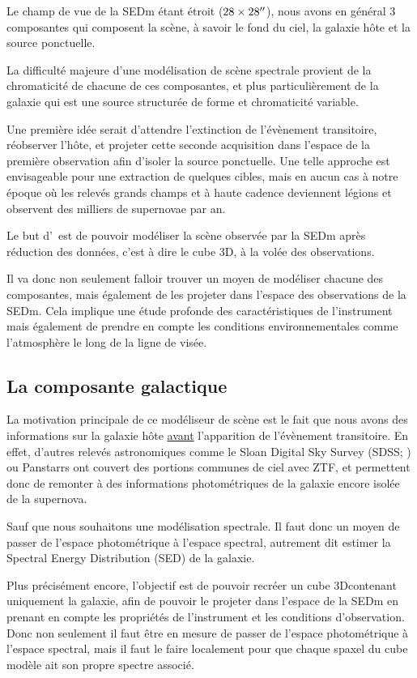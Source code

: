 \documentclass[../main/main.tex]{subfiles}
\begin{document}
Le champ de vue de la SEDm étant étroit ($28\times28^{\prime\prime}$), nous
avons en général $3$ composantes qui composent la
scène, à savoir le fond du ciel, la galaxie hôte et la source ponctuelle.

La difficulté majeure d'une modélisation de scène spectrale provient de la chromaticité de chacune de ces
composantes, et plus particulièrement de la galaxie qui est une source
structurée de forme et chromaticité variable.

Une première idée serait d'attendre l'extinction de l'évènement
transitoire, réobserver l'hôte, et projeter cette seconde acquisition
dans l'espace de la première observation afin d'isoler la source
ponctuelle. Une telle approche est envisageable pour une extraction de
quelques cibles, mais en aucun cas à notre époque où les relevés grands
champs et à haute cadence deviennent légions et observent des milliers
de supernovae par an.

Le but d'\hypergal\ est de pouvoir modéliser la scène observée
par la SEDm après réduction des données, c'est à dire le cube 3D, à la
volée des observations.

Il va donc non seulement falloir trouver un moyen de modéliser chacune
des composantes, mais également de les projeter dans l'espace des
observations de la SEDm. Cela implique une étude profonde des caractéristiques de
l'instrument mais également de prendre en compte les conditions
environnementales comme l'atmosphère le long de la ligne de visée.


\subsection{La composante galactique}

La motivation principale de ce modéliseur de scène est le fait que nous
avons des informations sur la galaxie hôte \underline{avant}
l'apparition de l'évènement transitoire. En effet, d'autres relevés
astronomiques comme le Sloan Digital Sky Survey (SDSS;
\citet{YorkSDSS2000}) ou Panstarrs \citep{ChambersPanstarrs} ont couvert
des portions communes de ciel avec ZTF, et permettent donc de remonter à
des informations photométriques de la galaxie encore isolée de la supernova.

Sauf que nous souhaitons une modélisation spectrale. Il faut donc un
moyen de passer de l'espace photométrique à l'espace spectral, autrement
dit estimer la Spectral Energy Distribution (SED) de la galaxie. 

Plus précisément encore, l'objectif est de pouvoir recréer un cube
3Dcontenant uniquement la galaxie, afin de pouvoir le projeter dans
l'espace de la SEDm en prenant en compte les propriétés de l'instrument et les
conditions d'observation. 
Donc non seulement il faut être en mesure de passer de l'espace
photométrique à l'espace spectral, mais il faut le faire localement pour
que chaque spaxel du cube modèle ait son propre spectre associé.
\end{document}
